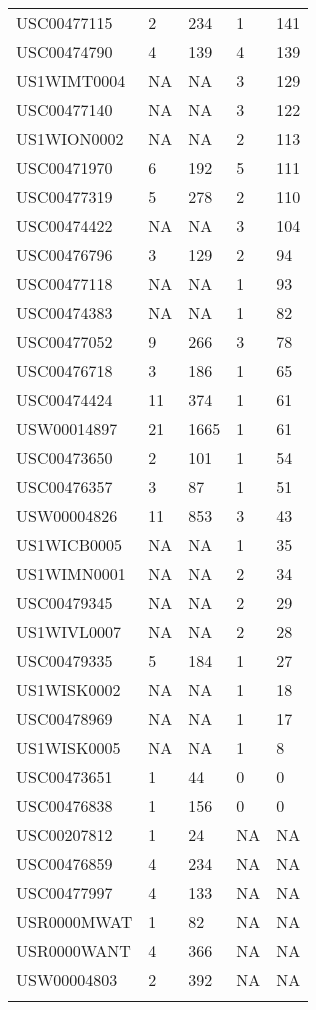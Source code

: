\begin{longtable}{l l l l l}
				  USC00477115 &   2 & 234 &   1 & 141 \\ 
				  USC00474790 &   4 & 139 &   4 & 139 \\ 
				  US1WIMT0004 & NA & NA &   3 & 129 \\ 
				  USC00477140 & NA & NA &   3 & 122 \\ 
				  US1WION0002 & NA & NA &   2 & 113 \\ 
				  USC00471970 &   6 & 192 &   5 & 111 \\ 
				  USC00477319 &   5 & 278 &   2 & 110 \\ 
				  USC00474422 & NA & NA &   3 & 104 \\ 
				  USC00476796 &   3 & 129 &   2 &  94 \\ 
				  USC00477118 & NA & NA &   1 &  93 \\ 
				  USC00474383 & NA & NA &   1 &  82 \\ 
				  USC00477052 &   9 & 266 &   3 &  78 \\ 
				  USC00476718 &   3 & 186 &   1 &  65 \\ 
				  USC00474424 &  11 & 374 &   1 &  61 \\ 
				  USW00014897 &  21 & 1665 &   1 &  61 \\ 
				  USC00473650 &   2 & 101 &   1 &  54 \\ 
				  USC00476357 &   3 &  87 &   1 &  51 \\ 
				  USW00004826 &  11 & 853 &   3 &  43 \\ 
				  US1WICB0005 & NA & NA &   1 &  35 \\ 
				  US1WIMN0001 & NA & NA &   2 &  34 \\ 
				  USC00479345 & NA & NA &   2 &  29 \\ 
				  US1WIVL0007 & NA & NA &   2 &  28 \\ 
				  USC00479335 &   5 & 184 &   1 &  27 \\ 
				  US1WISK0002 & NA & NA &   1 &  18 \\ 
				  USC00478969 & NA & NA &   1 &  17 \\ 
				  US1WISK0005 & NA & NA &   1 &   8 \\ 
				  USC00473651 &   1 &  44 &   0 &   0 \\ 
				  USC00476838 &   1 & 156 &   0 &   0 \\ 
				  USC00207812 &   1 &  24 & NA & NA \\ 
				  USC00476859 &   4 & 234 & NA & NA \\ 
				  USC00477997 &   4 & 133 & NA & NA \\ 
				  USR0000MWAT &   1 &  82 & NA & NA \\ 
				  USR0000WANT &   4 & 366 & NA & NA \\ 
				  USW00004803 &   2 & 392 & NA & NA \\ 
   \label{tab:climate_stations}
		\end{longtable}
